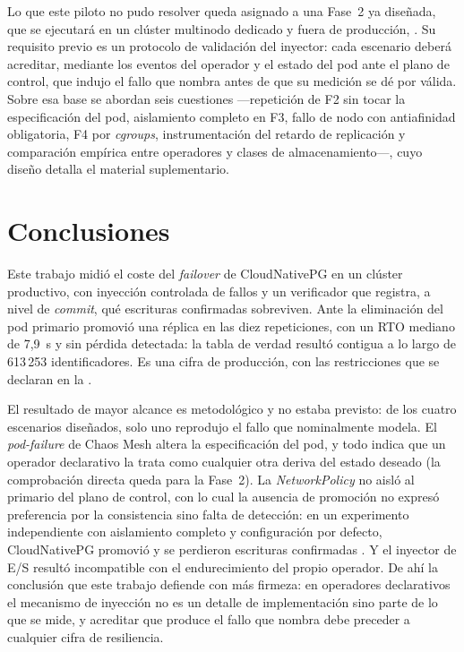 Lo que este piloto no pudo resolver queda asignado a una Fase~2 ya diseñada, que se ejecutará en un clúster multinodo dedicado y fuera de producción, . Su requisito previo es un protocolo de validación del inyector: cada escenario deberá acreditar, mediante los eventos del operador y el estado del pod ante el plano de control, que indujo el fallo que nombra antes de que su medición se dé por válida. Sobre esa base se abordan seis cuestiones —repetición de F2 sin tocar la especificación del pod, aislamiento completo en F3, fallo de nodo con antiafinidad obligatoria, F4 por \textit{cgroups}, instrumentación del retardo de replicación y comparación empírica entre operadores y clases de almacenamiento—, cuyo diseño detalla el material suplementario.

\section{Conclusiones}\label{sec:concl}
Este trabajo midió el coste del \textit{failover} de CloudNativePG en un clúster productivo, con inyección controlada de fallos y un verificador que registra, a nivel de \textit{commit}, qué escrituras confirmadas sobreviven. Ante la eliminación del pod primario promovió una réplica en las diez repeticiones, con un RTO mediano de 7,9~s y sin pérdida detectada: la tabla de verdad resultó contigua a lo largo de 613\,253 identificadores. Es una cifra de producción, con las restricciones que se declaran en la .

El resultado de mayor alcance es metodológico y no estaba previsto: de los cuatro escenarios diseñados, solo uno reprodujo el fallo que nominalmente modela. El \textit{pod-failure} de Chaos Mesh altera la especificación del pod, y todo indica que un operador declarativo la trata como cualquier otra deriva del estado deseado (la comprobación directa queda para la Fase~2). La \textit{NetworkPolicy} no aisló al primario del plano de control, con lo cual la ausencia de promoción no expresó preferencia por la consistencia sino falta de detección: en un experimento independiente con aislamiento completo y configuración por defecto, CloudNativePG promovió y se perdieron escrituras confirmadas \citep{sivko2026}. Y el inyector de E/S resultó incompatible con el endurecimiento del propio operador. De ahí la conclusión que este trabajo defiende con más firmeza: en operadores declarativos el mecanismo de inyección no es un detalle de implementación sino parte de lo que se mide, y acreditar que produce el fallo que nombra debe preceder a cualquier cifra de resiliencia.

